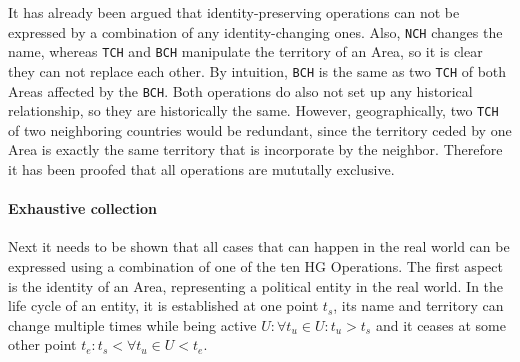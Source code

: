 It has already been argued that identity-preserving operations can not be expressed by a combination of any identity-changing ones. Also, \texttt{NCH} changes the name, whereas \texttt{TCH} and \texttt{BCH} manipulate the territory of an Area, so it is clear they can not replace each other. By intuition, \texttt{BCH} is the same as two \texttt{TCH} of both Areas affected by the \texttt{BCH}. Both operations do also not set up any historical relationship, so they are historically the same. However, geographically, two \texttt{TCH} of two neighboring countries would be redundant, since the territory ceded by one Area is exactly the same territory that is incorporate by the neighbor. Therefore it has been proofed that all operations are mututally exclusive.


\paragraph{Exhaustive collection} %
\label{par:exhaustive_collection}

Next it needs to be shown that all cases that can happen in the real world can be expressed using a combination of one of the ten HG Operations. The first aspect is the identity of an Area, representing a political entity in the real world. In the life cycle of an entity, it is established at one point $t_s$, its name and territory can change multiple times while being active $U: \forall t_u \in U: t_u > t_s$ and it ceases at some other point $t_e: t_s < \forall t_u \in U < t_e$.



